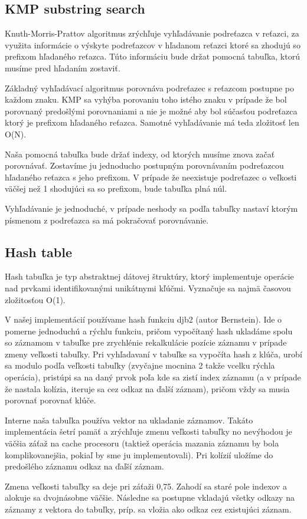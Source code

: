 \documentclass[12pt,a4paper,titlepage,final]{article}
\begin{document}

\subsection{KMP substring search}
Knuth-Morris-Prattov algoritmus zrýchľuje vyhľadávanie podreťazca v reťazci, za
 využita informácie o výskyte podreťazcov v hľadanom reťazci ktoré sa
 zhodujú so prefixom hľadaného reťazca. Túto informáciu bude držat pomocná
 tabuľka, ktorú musíme pred hľadaním zostaviť.

Základný vyhľadávací algoritmus porovnáva podreťazec s reťazcom postupne po
 každom znaku. KMP sa vyhýba porovaniu toho istého znaku v prípade že bol
 porovnaný predošlými porovnaniami a nie je možné aby bol súčasťou podreťazca
 ktorý je prefixom hľadaného reťazca. Samotné vyhľadávanie má teda zložitosť
 len O(N).

Naša pomocná tabuľka bude držať indexy, od ktorých musíme znova začať porovnávať.
 Zostavíme ju jednoducho postupným porovnávaním podreťazcou hľadaného reťazca s
 jeho prefixom. V prípade že neexistuje podreťazec o veľkosti väčšej než 1
 shodujúci sa so prefixom, bude tabuľka plná núl.

Vyhľadávanie je jednoduché, v prípade neshody sa podľa tabuľky nastaví ktorým
 písmenom z podreťazca sa má pokračovať porovnávanie.

\subsection{Hash table}
Hash tabuľka je typ abstraktnej dátovej štruktúry, ktorý implementuje operácie
 nad prvkami identifikovanými unikátnymi kľúčmi. Vyznačuje sa najmä časovou
 zložitosťou O(1).

V našej implementácií používame hash funkciu djb2 (autor Bernstein). Ide o
 pomerne jednoduchú a rýchlu funkciu, pričom vypočítaný hash ukladáme spolu so
 záznamom v tabuľke pre zrychlénie rekalkulácie pozície záznamu v prípade
 zmeny veľkosti tabuľky. Pri vyhľadavaní v tabuľke sa vypočíta hash z klúča,
 urobí sa modulo podľa veľkosti tabuľky (zvyčajne mocnina 2 takže vcelku rýchla
 operácia), pristúpi sa na daný prvok poľa kde sa zistí index záznamu (a v
 prípade že nastala kolízia, iteruje sa cez odkaz na ďalší záznam), pričom vždy
 sa musia porovnať porovnať klúče.

Interne naša tabuľka používa vektor na ukladanie záznamov. Takáto implementácia
 šetrí pamäť a zrýchľuje zmenu veľkosti tabuľky no nevýhodou je väčšia záťaž na
 cache procesoru (taktiež operácia mazania záznamu by bola komplikovanejšia,
 pokiaľ by sme ju implementovali). Pri kolízií uložíme do predošlého záznamu
 odkaz na ďaľší záznam.

Zmena veľkosti tabuľky sa deje pri záťaži 0,75. Zahodí sa staré pole indexov a
 alokuje sa dvojnásobne väčšie. Následne sa postupne vkladajú všetky odkazy na
 záznamy z vektora do tabuľky, príp. sa vložia ako odkaz cez existujúci záznam.

\end{document}
